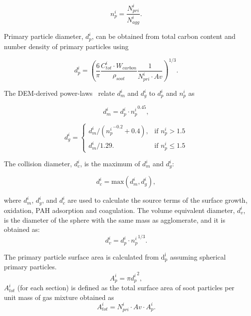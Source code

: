 \begin{equation}
	n^i_p = \frac{N^i_{pri}}{N^i_{agg}}
	\label{eqn:n_p}.
\end{equation}

 Primary particle diameter, ${d^i_p}$, can be obtained from total carbon content and number density of primary particles using

\begin{equation}
	d^i_p = \left(\frac{6}{\pi} \frac{C^i_{tot}\cdot W_{carbon}}{\rho_{soot}} \frac{1}{N^i_{pri}\cdot Av} \right)^{1/3}.
	\label{eqn:d_p}
\end{equation}

 The DEM-derived power-laws~\citep{Kelesidis2017} relate ${d^i_m}$ and ${d^i_g}$ to ${d^i_p}$ and ${n^i_p}$ as

\begin{equation}
	d^i_{m} = d^i_p\cdot {n^i_p}^{0.45}
	\label{eqn:d_m},
\end{equation}

\begin{equation}
	d^i_g = 
	\left\{
	\begin{array}{lr}
		d^i_m/({n^i_p}^{-0.2}+0.4), & \text{if } n^i_p > 1.5\\
		d^i_m/1.29. & \text{if } n^i_p\leq 1.5
	\end{array}
	\right.
	\label{eqn:d_g}
\end{equation}

 The collision diameter, ${d^i_c}$, is the maximum of ${d^i_{m}}$ and ${d^i_{g}}$:

\begin{equation}
	d^i_c = \mathrm{max}\left(d^i_m, d^i_g\right),
	\label{eqn:d_c}
\end{equation}

   \noindent where ${d^i_{m}}$, ${d^i_{g}}$, and ${d^i_{c}}$ are used to calculate the source terms of the surface growth, oxidation, PAH adsorption and coagulation. The volume equivalent diameter, $d^i_v$, is the diameter of the sphere with the same mass as agglomerate, and it is obtained as:
\begin{equation}
	d^i_v = d^i_p \cdot {n^i_p}^{1/3}
	\label{eqn:d_v}.
\end{equation}

 The primary particle surface area is calculated from $\mathrm{d^i_p}$ assuming spherical primary particles.
\begin{equation}
	A^i_{p} = \pi {d^i_p}^2
	\label{eqn:Ap},
\end{equation}
 $A^i_{tot}$ (for each section) is defined as the total surface area of soot particles per unit mass of gas mixture obtained as
\begin{equation}
	A^i_{tot} = N^i_{pri}\cdot Av\cdot A^i_{p}
	\label{eqn:Atot}.
\end{equation}

